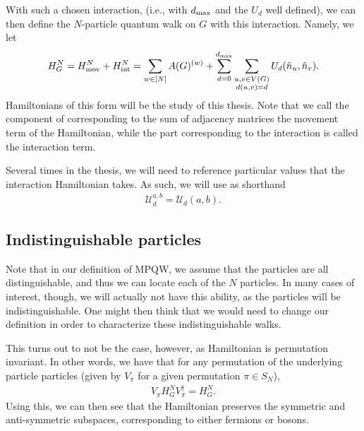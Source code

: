 \documentclass[../thesis-main/thesis-main]{subfiles}
\begin{document}
With such a chosen interaction, (i.e., with $d_{\text{max}}$ and the $U_d$ well defined), we can then define the $N$-particle quantum walk on $G$ with this interaction.  Namely, we let 
\begin{align}
  H_G^N = H_{\text{mov}}^N + H_{\text{int}}^N = \sum_{w\in [N]} A(G)^{(w)} + \sum_{d=0}^{d_{\text{max}}}  \sum_{\substack{ u,v\in V(G)\\d(u,v) = d}}U_{d} (\hat{n}_u,\hat{n}_v). 
  \label{eq:MPQW_H_defn}
\end{align}
Hamiltonians of this form will be the study of this thesis.  Note that we call the component of  corresponding to the sum of adjacency matrices  the movement term of the Hamiltonian, while the part corresponding to the interaction  is called the interaction term.

Several times in the thesis, we will need to reference particular values that the interaction Hamiltonian takes.  As such, we will use as shorthand 
\begin{align}
  \mathcal{U}_{d}^{a,b} = \mathcal{U}_{d} (a,b).
\end{align}

\subsection{Indistinguishable particles}

Note that in our definition of MPQW, we assume that the particles are all distinguishable, and thus we can locate each of the $N$ particles.  In many cases of interest, though, we will actually not have this ability, as the particles will be indistinguishable.  One might then think that we would need to change our definition in order to characterize these indistinguishable walks.

This turns out to not be the case, however, as Hamiltonian  is permutation invariant.  In other words, we have that for any permutation of the underlying particle particles (given by $V_\pi$ for a given permutation $\pi \in S_N$),
\begin{align}
  V_\pi H_{G}^N V_\pi^\dag = H_G^N.
\end{align}
Using this, we can then see that the Hamiltonian preserves the symmetric and anti-symmetric subspaces, corresponding to either fermions or bosons.
\end{document}
